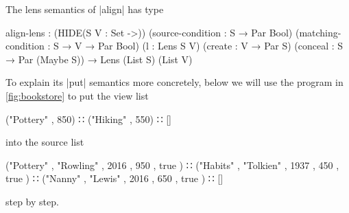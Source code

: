 \documentclass{sigplanconf}
\begin{document}
The lens semantics of |align| has type
\begin{code}
align-lens : (HIDE({S V : Set} ->))
  (source-condition : S → Par Bool)
  (matching-condition : S → V → Par Bool)
  (l : Lens S V)
  (create : V → Par S)
  (conceal : S → Par (Maybe S)) →
  Lens (List S) (List V)
\end{code}
To explain its |put| semantics more concretely, below we will use the program in \autoref{fig:bookstore} to put the view list
\begin{code}
("Pottery" , 850) ∷ ("Hiking" , 550) ∷ []
\end{code}
into the source list
\begin{code}
("Pottery"  , "Rowling"  , 2016  , 950  , true  ) ∷
("Habits"   , "Tolkien"  , 1937  , 450  , true  ) ∷
("Nanny"    , "Lewis"    , 2016  , 650  , true  ) ∷ []
\end{code}
step by step.
\end{document}
